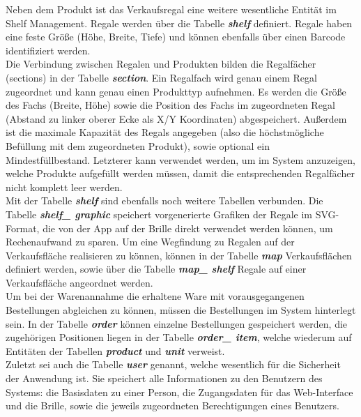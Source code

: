 Neben dem Produkt ist das Verkaufsregal eine weitere wesentliche Entität im Shelf Management. Regale werden über die Tabelle \textit{\textbf{shelf}} definiert. Regale haben eine feste Größe (Höhe, Breite, Tiefe) und können ebenfalls über einen Barcode identifiziert werden.\\

Die Verbindung zwischen Regalen und Produkten bilden die Regalfächer (\glqq sections\grqq ) in der Tabelle \textit{\textbf{section}}. Ein Regalfach wird genau einem Regal zugeordnet und kann genau einen Produkttyp aufnehmen. Es werden die Größe des Fachs (Breite, Höhe) sowie die Position des Fachs im zugeordneten Regal (Abstand zu linker oberer Ecke als X/Y Koordinaten) abgespeichert. Außerdem ist die maximale Kapazität des Regals angegeben (also die höchstmögliche Befüllung mit dem zugeordneten Produkt), sowie optional ein Mindestfüllbestand. Letzterer kann verwendet werden, um im System anzuzeigen, welche Produkte aufgefüllt werden müssen, damit die entsprechenden Regalfächer nicht komplett leer werden.\\

Mit der Tabelle  \textit{\textbf{shelf}} sind ebenfalls noch weitere Tabellen verbunden. Die Tabelle  \textit{\textbf{shelf\_ graphic}} speichert vorgenerierte Grafiken der Regale im \ac{SVG}-Format, die von der App auf der Brille direkt verwendet werden können, um Rechenaufwand zu sparen. Um eine Wegfindung zu Regalen auf der Verkaufsfläche realisieren zu können, können in der Tabelle \textit{\textbf{map}} Verkaufsflächen definiert werden, sowie über die Tabelle \textit{\textbf{map\_ shelf}} Regale auf einer Verkaufsfläche angeordnet werden.\\

Um bei der Warenannahme die erhaltene Ware mit vorausgegangenen Bestellungen abgleichen zu können, müssen die Bestellungen im System hinterlegt sein. In der Tabelle \textit{\textbf{order}} können einzelne Bestellungen gespeichert werden, die zugehörigen Positionen liegen in der Tabelle \textit{\textbf{order\_ item}}, welche wiederum auf Entitäten der Tabellen  \textit{\textbf{product}} und \textit{\textbf{unit}} verweist.\\

Zuletzt sei auch die Tabelle \textit{\textbf{user}} genannt, welche wesentlich für die Sicherheit der Anwendung ist. Sie speichert alle Informationen zu den Benutzern des Systems: die Basisdaten zu einer Person, die Zugangsdaten für das Web-Interface und die Brille, sowie die jeweils zugeordneten Berechtigungen eines Benutzers.\\

